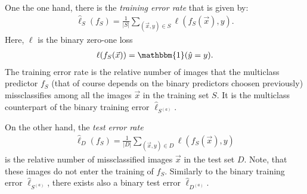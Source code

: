 One the one hand, there is the \textit{training error rate} that is given by:
\begin{align}\label{eq:training_error}
	\hat{\ell}_{S}(f_S) = \frac{1}{|S|} \sum_{(\vec{x}, y) \in S} \ell(f_S(\vec{x}), y).
\end{align}
Here, $\ell$ is the binary zero-one loss
\begin{align*}
	\ell(f_S(\vec{x})) = \mathbbm{1}(\hat{y} = y).
\end{align*}
The training error rate is the relative number of images that the multiclass predictor $f_S$ (that of course depends on the binary predictors choosen previously) missclassifies among all the images $\vec{x}$ in the training set $S$. It is the multiclass counterpart of the binary training error $\hat{\ell}_{S^{(a)}}$.

On the other hand, the \textit{test error rate}
\begin{align}\label{eq:test_error}
	\hat{\ell}_{D}(f_S) = \frac{1}{|D|} \sum_{(\vec{x}, y) \in D} \ell(f_S(\vec{x}), y)
\end{align}
is the relative number of missclassified images $\vec{x}$ in the test set $D$. Note, that these images do not enter the training of $f_S$. Similarly to the binary training error $\hat{\ell}_{S^{(a)}}$, there exists also a binary test error $\hat{\ell}_{D^{(a)}}$.